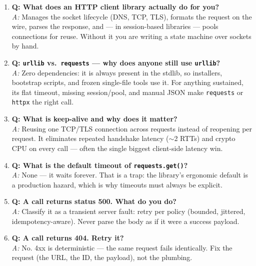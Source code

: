 \begin{enumerate}
  \item \textbf{Q: What does an HTTP client library actually do for you?}\\
        \textit{A:} Manages the socket lifecycle (DNS, TCP, TLS), formats the
        request on the wire, parses the response, and --- in session-based
        libraries --- pools connections for reuse. Without it you are writing
        a state machine over sockets by hand.

  \item \textbf{Q: \texttt{urllib} vs.\ \texttt{requests} --- why does anyone
        still use \texttt{urllib}?}\\
        \textit{A:} Zero dependencies: it is always present in the stdlib, so
        installers, bootstrap scripts, and frozen single-file tools use it.
        For anything sustained, its flat timeout, missing session/pool, and
        manual JSON make \texttt{requests} or \texttt{httpx} the right call.

  \item \textbf{Q: What is keep-alive and why does it matter?}\\
        \textit{A:} Reusing one TCP/TLS connection across requests instead of
        reopening per request. It eliminates repeated handshake latency
        ($\sim$2 RTTs) and crypto CPU on every call --- often the single
        biggest client-side latency win.

  \item \textbf{Q: What is the default timeout of \texttt{requests.get()}?}\\
        \textit{A:} None --- it waits forever. That is a trap: the library's
        ergonomic default is a production hazard, which is why timeouts must
        always be explicit.

  \item \textbf{Q: A call returns status 500. What do you do?}\\
        \textit{A:} Classify it as a transient server fault: retry per policy
        (bounded, jittered, idempotency-aware). Never parse the body as if it
        were a success payload.

  \item \textbf{Q: A call returns 404. Retry it?}\\
        \textit{A:} No. 4xx is deterministic --- the same request fails
        identically. Fix the request (the URL, the ID, the payload), not the
        plumbing.


\end{enumerate}
